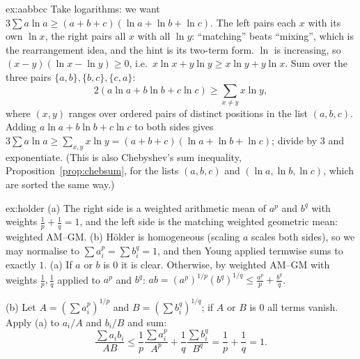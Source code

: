 \begin{solution}{ex:aabbcc}
\idea Take logarithms: we want $3\sum a\ln a\ge(a+b+c)(\ln a+\ln b+\ln c)$. The left pairs each $x$ with its own $\ln x$, the right pairs all $x$ with all $\ln y$: ``matching'' beats ``mixing'', which is the rearrangement idea, and the hint is its two-term form.
\writeup $\ln$ is increasing, so $(x-y)(\ln x-\ln y)\ge0$, i.e.\ $x\ln x+y\ln y\ge x\ln y+y\ln x$. Sum over the three pairs $\{a,b\},\{b,c\},\{c,a\}$:
\[
2(a\ln a+b\ln b+c\ln c)\ge\sum_{x\ne y}x\ln y,
\]
where $(x,y)$ ranges over ordered pairs of distinct positions in the list $(a,b,c)$. Adding $a\ln a+b\ln b+c\ln c$ to both sides gives $3\sum a\ln a\ge\sum_{x,y}x\ln y=(a+b+c)(\ln a+\ln b+\ln c)$;
divide by $3$ and exponentiate. (This is also Chebyshev's sum inequality, Proposition~\ref{prop:chebsum}, for the lists $(a,b,c)$ and $(\ln a,\ln b,\ln c)$, which are sorted the same way.)
\end{solution}

\begin{solution}{ex:holder}
\idea (a) The right side is a weighted arithmetic mean of $a^p$ and $b^q$ with weights $\frac1p+\frac1q=1$, and the left side is the matching weighted geometric mean: weighted AM--GM. (b) H\"older is homogeneous (scaling $a$ scales both sides), so we may normalise to $\sum a_i^p=\sum b_i^q=1$, and then Young applied termwise sums to exactly $1$.
\writeup (a) If $a$ or $b$ is $0$ it is clear. Otherwise, by weighted AM--GM with weights $\frac1p,\frac1q$ applied to $a^p$ and $b^q$:
$ab=(a^p)^{1/p}(b^q)^{1/q}\le\frac{a^p}p+\frac{b^q}q$.

(b) Let $A=\left(\sum a_i^p\right)^{1/p}$ and $B=\left(\sum b_i^q\right)^{1/q}$; if $A$ or $B$ is $0$ all terms vanish. Apply (a) to $a_i/A$ and $b_i/B$ and sum:
\[
\frac{\sum a_ib_i}{AB}\le\frac1p\frac{\sum a_i^p}{A^p}+\frac1q\frac{\sum b_i^q}{B^q}=\frac1p+\frac1q=1.
\]
\end{solution}

